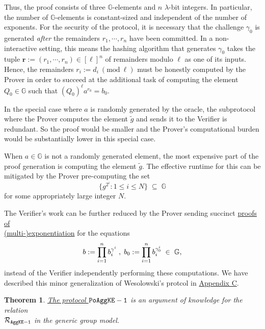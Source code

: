 \documentclass[11pt, lettersize, notitlepage, leqno, footskip=0.6cm]{article}
\newcommand{\pl}{\prod\limits}
\newcommand{\bG}{\mathbb{G}}
\newcommand{\wti}{\widetilde}
\newcommand{\mc}{\mathcal}
\newcommand{\mb}{\mathbb}
\newcommand{\mbf}{\mathbf}
\newcommand{\lam}{\lambda}
\newcommand{\sub}{\subseteq}
\newcommand{\vs}{\vspace{-0.15cm}}
\newcommand{\Mod}[1]{\ (\mathrm{mod}\ #1)}
\newtheorem{Thm}{Theorem}[section]
\numberwithin{equation}{section}
\begin{document}
Thus, the proof consists of three $\mb{G}$-elements and $n$ $\lam$-bit integers. In particular, the number of $\mb{G}$-elements is constant-sized and independent of the number of exponents. For the security of the protocol, it is necessary that the challenge $\gamma_{0}$ is generated \textit{after} the remainders $r_1,\cdots,r_n$ have been committed. In a non-interactive setting, this means the hashing algorithm that generates $\gamma_{0}$ takes the tuple $\mbf{r}:= (r_1,\cdots,r_n)\in [\ell]^n$ of remainders modulo $\ell$ as one of its inputs. Hence, the remainders $r_i:= d_i\Mod{\ell}$ must be honestly computed by the Prover in order to succeed at the additional task of computing the element $Q_0\in\mb{G}$ such that $(Q_0)^{\ell}a^{r_0} = b_0$.

In the special case where $a$ is randomly generated by the oracle, the subprotocol where the Prover computes the element $\wti{g}$ and sends it to the Verifier is redundant. So the proof would be smaller and the Prover's computational burden would be substantially lower in this special case.

When $a\in\bG$ is not a randomly generated element, the most expensive part of the proof generation is computing the element $\wti{g}$. The effective runtime for this can be mitigated by the Prover pre-computing the set \vs $$\{g^{2^i}: 1\leq i \leq N \}\;\sub\;\bG $$ for some appropriately large integer $N$.

The Verifier's work can be further reduced by the Prover sending succinct \hyperlink{PoME}{proofs of \\ (multi-)exponentiation} for the equations \vs $$b := \pl_{i=1}^n b_i^{\gamma^i}\;,\;b_0 := \pl_{i=1}^n b_i^{\gamma_{0}^i}\;\in\;\bG,\vs $$ instead of the Verifier independently performing these computations. We have described this minor generalization of Wesolowski's protcol in \hyperlink{PoME}{Appendix C}.


\vspace{0.2cm}

\begin{Thm} \hyperlink{AggKE-1}{The protocol $\tt{PoAggKE-1}$} is an argument of knowledge for the relation\\ $\mc{R}_{{\tt{AggKE-1}}}$ in the generic group model.\end{Thm}
\end{document}
